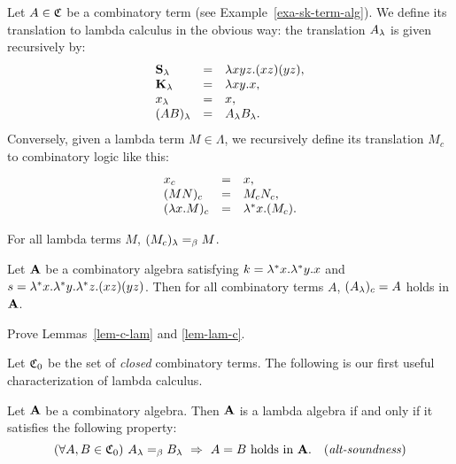 \documentclass{article}
\begin{document}
\begin{definition}
  Let $A\in{\mathfrak C}$ be a combinatory term (see
  Example~\ref{exa-sk-term-alg}). We define its translation to lambda
  calculus in the obvious way: the translation $A_\lambda$ is given
  recursively by:
  \[\begin{array}{lll}
    {\bf S}_\lambda &=& \lambda xyz.(xz)(yz), \\
    {\bf K}_\lambda &=& \lambda xy.x, \\
    x_\lambda &=& x, \\
    (AB)_\lambda &=& A_\lambda B_\lambda.
  \end{array}
  \]
  Conversely, given a lambda term $M\in\Lambda$, we recursively define
  its translation $M_c$ to combinatory logic like this:
  \[\begin{array}{lll}
    x_c &=& x,\\
    (MN)_c &=& M_c N_c,\\
    (\lambda x.M)_c &=& \lambda^*x.(M_c).\\
  \end{array}
  \]
\end{definition}

\begin{lemma}\label{lem-c-lam}
  For all lambda terms $M$, $(M_c)_\lambda =_{\beta} M$.
\end{lemma}

\begin{lemma}\label{lem-lam-c}
  Let ${\bf A}$ be a combinatory algebra satisfying $k =
  \lambda^*x.\lambda^*y.x$ and $s = \lambda^*x.\lambda^*y.\lambda^*z.(xz)(yz)$.  Then
  for all combinatory terms $A$, $(A_\lambda)_c=A$ holds in ${\bf A}$.
\end{lemma}

\begin{exercise}
  Prove Lemmas~\ref{lem-c-lam} and {\ref{lem-lam-c}}.
\end{exercise}

Let ${\mathfrak C}_0$ be the set of {\em closed} combinatory terms.
The following is our first useful characterization of lambda calculus.

\begin{lemma}\label{lem-alt-soundness}
  Let ${\bf A}$ be a combinatory algebra. Then ${\bf A}$ is a lambda algebra
  if and only if it satisfies the following property:
  \[ (\forall A,B\in{\mathfrak C}_0)\hspace{.35em} A_\lambda =_{\beta} B_\lambda 
  \hspace{.35em}\Rightarrow\hspace{.35em} A=B\mbox{ holds in ${\bf A}$}.
  \hspace{1em} \textrm{(\textit{alt-soundness\/})}
  \]
\end{lemma}
\end{document}
